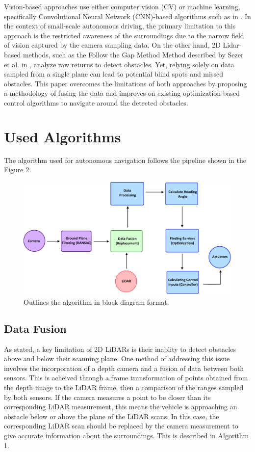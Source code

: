 \documentclass[conference]{IEEEtran}
\begin{document}
Vision-based approaches use either computer vision (CV) or machine learning, specifically Convolutional Neural Network (CNN)-based algorithms such as in \cite{b3}. In the context of small-scale autonomous driving, the primary limitation to this approach is the restricted awareness of the surroundings due to the narrow field of vision captured by the camera sampling data. On the other hand, 2D Lidar-based methods, such as the Follow the Gap Method Method described by Sezer et al. in \cite{b4}, analyze raw returns to detect obstacles. Yet, relying solely on data sampled from a single plane can lead to potential blind spots and missed obstacles. This paper overcomes the limitations of both approaches by proposing a methodology of fusing the data and improves on existing optimization-based control algorithms to navigate around the detected obstacles.

\section{Used Algorithms}
The algorithm used for autonomous navigation follows the pipeline shown in the Figure 2.   


\begin{figure}[h!]
    \centering
    \includegraphics[scale=0.13]{algorithm.png}
    \caption{Outlines the algorithm in block diagram format.}
    \label{Figure 4}
\end{figure}



\subsection{Data Fusion}
As stated, a key limitation of 2D LiDARs is their inablity to detect obstacles above and below their scanning plane. One method of addressing this issue involves the incorporation of a depth camera and a fusion of data between both sensors. This is acheived through a frame transformation of points obtained from the depth image to the LiDAR frame, then a comparison of the ranges sampled by both sensors. If the camera measures a point to be closer than its corresponding LiDAR measurement, this means the vehicle is approaching an obstacle below or above the plane of the LiDAR scans. In this case, the corresponding LiDAR scan should be replaced by the camera measurement to give accurate information about the surroundings. This is described in Algorithm 1.
\end{document}
